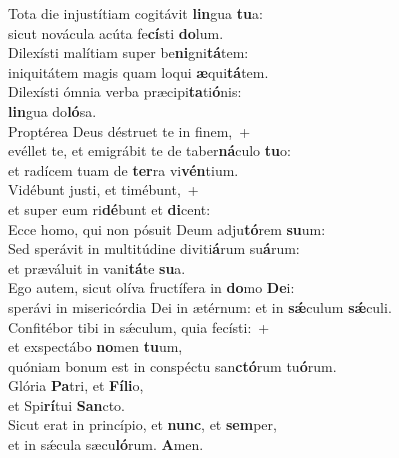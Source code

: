 \evenverse Tota die injustítiam cogitávit \textbf{lin}gua \textbf{tu}a:~\*\\
\evenverse sicut novácula acúta fe\textbf{cí}sti \textbf{do}lum.\\
\oddverse Dilexísti malítiam super be\textbf{ni}gni\textbf{tá}tem:~\*\\
\oddverse iniquitátem magis quam loqui \textbf{æ}qui\textbf{tá}tem.\\
\evenverse Dilexísti ómnia verba præcipi\textbf{ta}ti\textbf{ó}nis:~\*\\
\evenverse \textbf{lin}gua do\textbf{ló}sa.\\
\oddverse Proptérea Deus déstruet te in finem,~+\\
\oddverse  evéllet te, et emigrábit te de taber\textbf{ná}culo \textbf{tu}o:~\*\\
\oddverse et radícem tuam de \textbf{ter}ra vi\textbf{vén}tium.\\
\evenverse Vidébunt justi, et timébunt,~+\\
\evenverse  et super eum ri\textbf{dé}bunt et \textbf{di}cent:~\*\\
\evenverse Ecce homo, qui non pósuit Deum adju\textbf{tó}rem \textbf{su}um:\\
\oddverse Sed sperávit in multitúdine diviti\textbf{á}rum su\textbf{á}rum:~\*\\
\oddverse et præváluit in vani\textbf{tá}te \textbf{su}a.\\
\evenverse Ego autem, sicut olíva fructífera in \textbf{do}mo \textbf{De}i:~\*\\
\evenverse sperávi in misericórdia Dei in ætérnum: et in \textbf{sǽ}culum \textbf{sǽ}culi.\\
\oddverse Confitébor tibi in sǽculum, quia fecísti:~+\\
\oddverse  et exspectábo \textbf{no}men \textbf{tu}um,~\*\\
\oddverse quóniam bonum est in conspéctu san\textbf{ctó}rum tu\textbf{ó}rum.\\
\evenverse Glória \textbf{Pa}tri, et \textbf{Fí}\textbf{li}o,~\*\\
\evenverse et Spi\textbf{rí}tui \textbf{San}cto.\\
\oddverse Sicut erat in princípio, et \textbf{nunc}, et \textbf{sem}per,~\*\\
\oddverse et in sǽcula sæcu\textbf{ló}rum. \textbf{A}men.\\
